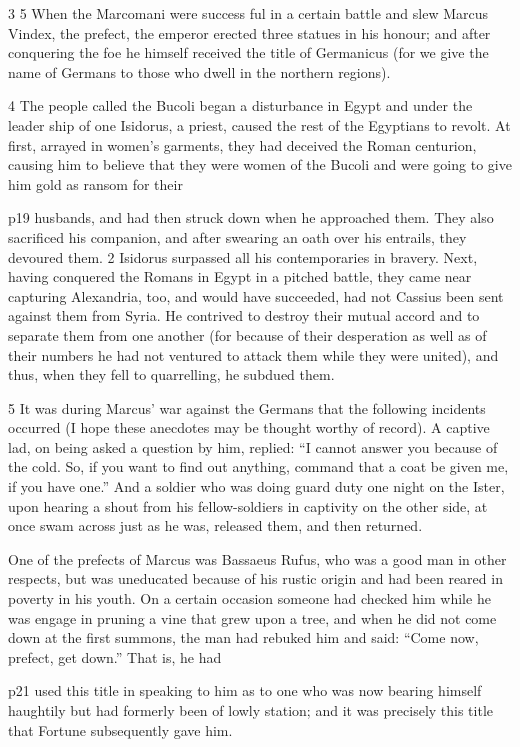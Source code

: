 3
5 When the Marcomani were success ­ful in a certain battle and slew Marcus Vindex, the prefect, the emperor erected three statues in his honour; and after conquering the foe he himself received the title of Germanicus (for we give the name of Germans to those who dwell in the northern regions).

4
The people called the Bucoli\texthebrew{⁠} began a disturbance in Egypt and under the leader ­ship of one Isidorus, a priest, caused the rest of the Egyptians to revolt. At first, arrayed in women's garments, they had deceived the Roman centurion, causing him to believe that they were women of the Bucoli and were going to give him gold as ransom for their

p19 husbands, and had then struck down when he approached them. They also sacrificed his companion, and after swearing an oath over his entrails, they devoured them. 2 Isidorus surpassed all his contemporaries in bravery. Next, having conquered the Romans in Egypt in a pitched battle, they came near capturing Alexandria, too, and would have succeeded, had not Cassius been sent against them from Syria. He contrived to destroy their mutual accord and to separate them from one another (for because of their desperation as well as of their numbers he had not ventured to attack them while they were united), and thus, when they fell to quarrelling, he subdued them.

5
It was during Marcus' war against the Germans that the following incidents occurred (I hope these anecdotes may be thought worthy of record). A captive lad, on being asked a question by him, replied: ``I cannot answer you because of the cold. So, if you want to find out anything, command that a coat be given me, if you have one.'' And a soldier who was doing guard duty one night on the Ister, upon hearing a shout from his fellow-soldiers in captivity on the other side, at once swam across just as he was, released them, and then returned.

One of the prefects of Marcus was Bassaeus Rufus, who was a good man in other respects, but was uneducated because of his rustic origin and had been reared in poverty in his youth. On a certain occasion someone had checked him while he was engage in pruning a vine that grew upon a tree, and when he did not come down at the first summons, the man had rebuked him and said: ``Come now, prefect, get down.'' That is, he had

p21 used this title in speaking to him as to one who was now bearing himself haughtily but had formerly been of lowly station; and it was precisely this title that Fortune subsequently gave him.

